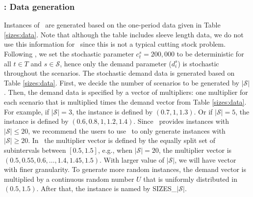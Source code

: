 \subsubsection{\sizes: Data generation}
Instances of \sizes\ are generated based on the one-period data given in Table \ref{sizes:data}. Note that although the table includes sleeve length data, we do not use this information for \sizes\ since this is not a typical cutting stock problem. Following \cite{journal:JSW1999}, we set the stochastic parameter $c_t^s=200,000$ to be deterministic for all $t\in T$ and $s\in\mathcal{S}$, hence only the demand parameter ($d_i^s$) is stochastic throughout the scenarios. The stochastic demand data is generated based on Table \ref{sizes:data}. First, we decide the number of scenarios to be generated by $|\mathcal{S}|$. Then, the demand data is specified by a vector of multipliers: one multiplier for each scenario that is multiplied times the demand vector from Table \ref{sizes:data}. For example, if $|\mathcal{S}|=3$, the instance is defined by $(0.7,1,1.3)$. Or if $|\mathcal{S}|=5$, the instance is defined by $(0.6,0.8,1,1.2,1.4)$. Since \siplib\ provides instances with $|\mathcal{S}|\le 20$, we recommend the users to use \siplibtwo\ to only generate instances with $|\mathcal{S}| \ge 20$. In \siplibtwo\, the multiplier vector is defined by the equally split set of subintervals between $[0.5,1.5]$, e.g., when $|\mathcal{S}|=20$, the multiplier vector is $(0.5,0.55,0.6,\ldots,1.4,1.45,1.5)$. With larger value of $|\mathcal{S}|$, we will have vector with finer granularity. To generate more random instances, the demand vector is multiplied by a continuous random number $U$ that is uniformly distributed in $(0.5,1.5)$. After that, the instance is named by SIZES\_$|\mathcal{S}|$.

